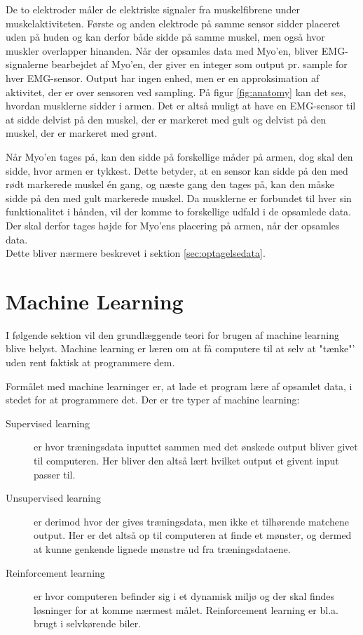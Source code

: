 De to elektroder måler de elektriske signaler fra muskelfibrene under muskelaktiviteten\citep{RefWorks:13}. Første og anden elektrode på samme sensor sidder placeret uden på huden og kan derfor både sidde på samme muskel, men også hvor muskler overlapper hinanden. Når der opsamles data med Myo'en, bliver EMG-signalerne bearbejdet af Myo'en, der giver en integer som output pr. sample for hver EMG-sensor. Output har ingen enhed, men er en approksimation af aktivitet, der er over sensoren ved sampling. På figur \ref{fig:anatomy} kan det ses, hvordan musklerne sidder i armen. Det er altså muligt at have en EMG-sensor til at sidde delvist på den muskel, der er markeret med gult og delvist på den muskel, der er markeret med grønt.


Når Myo'en tages på, kan den sidde på forskellige måder på armen, dog skal den sidde, hvor armen er tykkest. Dette betyder, at en sensor kan sidde på den med rødt markerede muskel én gang, og næste gang den tages på, kan den måske sidde på den med gult markerede muskel. Da musklerne er forbundet til hver sin funktionalitet i hånden, vil der komme to forskellige udfald i de opsamlede data. Der skal derfor tages højde for Myo'ens placering på armen, når der opsamles data.\\
Dette bliver nærmere beskrevet i sektion \ref{sec:optagelsedata}.

\section{Machine Learning}
\label{sec:machineLearning}
I følgende sektion vil den grundlæggende teori for brugen af machine learning blive belyst. Machine learning er læren om at få computere til at selv at "tænke"' uden rent faktisk at programmere dem.

Formålet med machine learninger er, at lade et program lære af opsamlet data, i stedet for at programmere det. Der er tre typer af machine learning\citep{PatternBishop}:
\begin{description}
	\item[Supervised learning] er hvor træningsdata inputtet sammen med det ønskede output bliver givet til computeren. Her bliver den altså lært hvilket output et givent input passer til.
	\item[Unsupervised learning] er derimod hvor der gives træningsdata, men ikke et tilhørende matchene output. Her er det altså op til computeren at finde et mønster, og dermed at kunne genkende lignede mønstre ud fra træningsdataene.
	\item[Reinforcement learning] er hvor computeren befinder sig i et dynamisk miljø og der skal findes løsninger for at komme nærmest målet. Reinforcement learning er bl.a. brugt i selvkørende biler.
\end{description}

